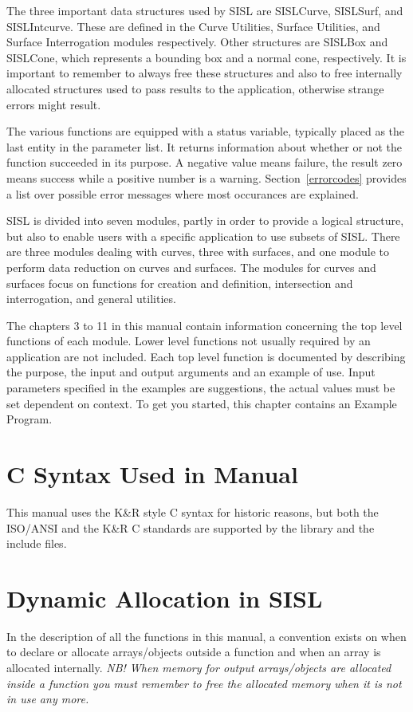 The three important data structures used by SISL are SISLCurve,
SISLSurf, and SISLIntcurve. These are defined in the Curve Utilities,
Surface Utilities, and Surface Interrogation modules respectively. Other
structures are SISLBox and SISLCone, which represents a bounding box and
a normal cone, respectively. It is
important to remember to always free these structures and also to free
internally allocated structures used to pass results to the application,
otherwise strange errors might result.

The various functions are equipped with a status variable, typically
placed as the last entity in the parameter list. It returns information
about whether or not the function succeeded in its purpose. A negative
value means failure, the result zero means success while a positive
number is a warning. Section~\ref{errorcodes} provides a list over
possible error messages where most occurances are explained. 

\medskip
SISL is divided into seven modules, partly in order to provide a logical
structure, but also to enable users with a specific application to use
subsets of SISL. There are three modules dealing with curves, three with
surfaces, and one module to perform data reduction on curves and
surfaces. The modules for
curves and surfaces focus on functions for creation and definition,
intersection and interrogation, and general utilities.

The chapters 3 to 11 in this manual contain information concerning the top
level functions of each module. Lower level functions not usually
required by an application are not included. Each top level function is
documented by describing the purpose, the input and output arguments and
an example of use. Input parameters specified in the examples are suggestions, the
actual values must be set dependent on context.
To get you started, this chapter contains an Example Program.


\section{\label{syntax}C Syntax Used in Manual}
This manual uses the K\&R style C syntax for historic reasons, but both
the ISO/ANSI and the K\&R C standards are supported by the library and
the include files.

\section{\label{dynamic}Dynamic Allocation in SISL}
In the description of all the functions in this manual, a
convention exists on when to declare or allocate arrays/objects outside a
function and when an array is allocated internally.
{\em NB! When memory for output arrays/objects are allocated inside a function you
must remember to free the allocated memory when it is not in use any
more.}

